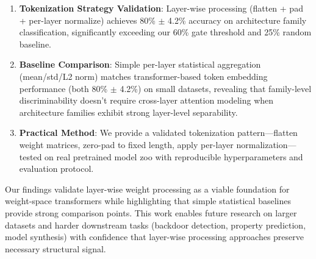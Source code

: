 \begin{enumerate}
\item \textbf{Tokenization Strategy Validation}: Layer-wise processing (flatten + pad + per-layer normalize) achieves 80\% $\pm$ 4.2\% accuracy on architecture family classification, significantly exceeding our 60\% gate threshold and 25\% random baseline.

\item \textbf{Baseline Comparison}: Simple per-layer statistical aggregation (mean/std/L2 norm) matches transformer-based token embedding performance (both 80\% $\pm$ 4.2\%) on small datasets, revealing that family-level discriminability doesn't require cross-layer attention modeling when architecture families exhibit strong layer-level separability.

\item \textbf{Practical Method}: We provide a validated tokenization pattern—flatten weight matrices, zero-pad to fixed length, apply per-layer normalization—tested on real pretrained model zoo with reproducible hyperparameters and evaluation protocol.
\end{enumerate}

Our findings validate layer-wise weight processing as a viable foundation for weight-space transformers while highlighting that simple statistical baselines provide strong comparison points. This work enables future research on larger datasets and harder downstream tasks (backdoor detection, property prediction, model synthesis) with confidence that layer-wise processing approaches preserve necessary structural signal.
